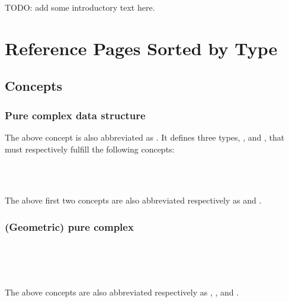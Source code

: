 

TODO: add some introductory text here.

\section{Reference Pages Sorted by Type}

\subsection*{Concepts}

\subsubsection*{Pure complex data structure}


The above concept is also abbreviated as . It defines three types,
,  and , that must respectively fulfill the
following concepts:

\\
\\

The above first two concepts are also abbreviated respectively as
 and .

\subsubsection*{(Geometric) pure complex}

\\
\\

\\

The above concepts are also abbreviated respectively as ,
, 
  and .

